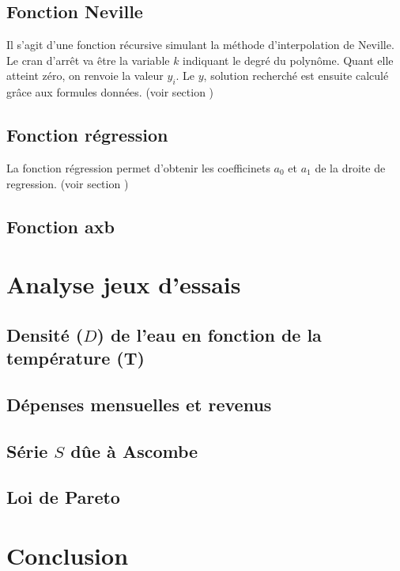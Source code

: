 \documentclass[12pt,french,titlepage]{article}
\begin{document}
	\subsection{Fonction Neville}
	
	\medskip
	Il s'agit d'une fonction récursive simulant la méthode d'interpolation de Neville. Le cran d'arrêt va être la variable $k$ indiquant le degré du polynôme. Quant elle atteint zéro, on renvoie la valeur $y_i$. Le $y$, solution recherché est ensuite calculé grâce aux formules données. (voir section )
	\subsection{Fonction régression}
	
	
	La fonction régression permet d'obtenir les coefficinets $a_0$ et $a_1$ de  la droite de regression. (voir section )
	\subsection{Fonction axb}
	
	\section{Analyse jeux d'essais}
	
	\subsection{Densité ($D$) de l'eau en fonction de la température (T)}
	
	\subsection{Dépenses mensuelles et revenus}
	
	\subsection{Série $S$ dûe à Ascombe}
	
	\subsection{Loi de Pareto}
	
	\section{Conclusion}
	
	
	
\end{document}

